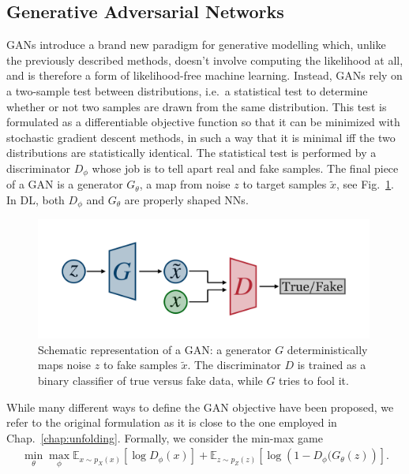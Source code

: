 \subsection{Generative Adversarial Networks}\label{intro:gan}
GANs introduce a brand new paradigm for generative modelling which, unlike the previously described methods, doesn't involve computing the likelihood at all, and is therefore a form of likelihood-free machine learning. Instead, GANs rely on a two-sample test between distributions, i.e.\   a statistical test to determine whether or not two samples are drawn from the same distribution. This test is formulated as a differentiable objective function so that it can be minimized with stochastic gradient descent methods, in such a way that it is minimal iff the two distributions are statistically identical.
The statistical test is performed by a discriminator $D_{\phi}$ whose job is to tell apart real and fake samples. The final piece of a GAN is a generator $G_{\theta}$, a map from noise $z$ to target samples $\tilde{x}$, see Fig.~\ref{fig:gan}. In DL, both $D_{\phi}$ and $G_{\theta}$ are properly shaped NNs.
%
\begin{figure}[t]
\centering
\includegraphics[page = 1, width=0.99\textwidth]{./figures/gan}
\caption{Schematic representation of a GAN: a generator $G$ deterministically maps noise $z$ to fake samples $\tilde{x}$. The discriminator $D$ is trained as a binary classifier of true versus fake data, while $G$ tries to fool it.}
\label{fig:gan}
\end{figure}
%
While many different ways to define the GAN objective have been proposed, we refer to the original formulation\cite{goodfellow} as it is close to the one employed in Chap.~\ref{chap:unfolding}. Formally, we consider the min-max game 
%
\begin{align}
\min_{\theta} \max_{\phi}\mathbb{E}_{x \sim p_{X}(x)} \left[ \log D_{\phi} (x) \right] + \mathbb{E}_{z\sim p_{Z}(z)} \left[ \log \left( 1 - D_{\phi} (G_{\theta}(z) \right) \right].
\end{align}
